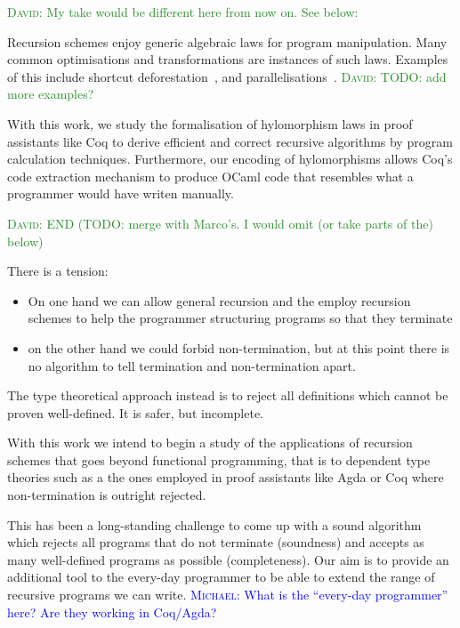 \documentclass[anonymous, a4paper, UKenglish, cleveref, autoref, thm-restate]{lipics-v2021}
\newcommand{\dcas}[1]{\textcolor{ForestGreen}{\textsc{David}: #1}}
\newcommand{\mvol}[1]{\textcolor{blue}{\textsc{Michael}: #1}}
\begin{document}
\dcas{My take would be different here from now on. See below:}

Recursion schemes enjoy generic algebraic laws for program manipulation. Many
common optimisations and transformations are instances of such laws. Examples of
this include shortcut deforestation~\cite{TakanoM95}, and
parallelisations~\cite{Gibbons96:Third}. \dcas{TODO: add more examples?}

With this work, we study the formalisation of hylomorphism laws in proof
assistants like Coq to derive efficient and correct recursive algorithms by
program calculation techniques. Furthermore, our encoding of hylomorphisms
allows Coq's code extraction mechanism to produce OCaml code that resembles what
a programmer would have writen manually.

\dcas{END (TODO: merge with Marco's. I would omit (or take parts of the) below)}

There is a tension:
\begin{itemize}
  \item On one hand we can allow general recursion and the employ recursion
schemes to help the programmer structuring programs so that they terminate
  \item on the other hand we could forbid non-termination, but at this point
there is no algorithm to tell termination and non-termination apart.
\end{itemize}

The type theoretical approach instead is to reject all definitions which cannot
be proven well-defined. It is safer, but incomplete.

With this work we intend to begin a study of the applications of recursion
schemes that goes beyond functional programming, that is to dependent type
theories such as a the ones employed in proof assistants like Agda or Coq where
non-termination is outright rejected.

This has been a long-standing challenge to come up with a sound algorithm which
rejects all programs that do not terminate (soundness) and accepts as many
well-defined programs as possible (completeness). Our aim is to provide an
additional tool to the every-day programmer to be able to extend the range of
recursive programs we can write.
\mvol{What is the ``every-day programmer'' here? Are they working in Coq/Agda?}
\end{document}
